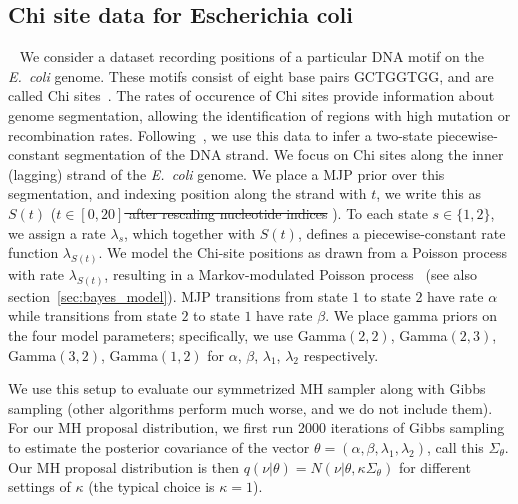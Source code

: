   \subsection{Chi site data for Escherichia coli}~
  We consider a dataset recording positions of a particular DNA motif 
  on the {\em E.\ coli} genome. 
  These motifs consist of eight base pairs GCTGGTGG, and are called Chi sites~\citep{FearnSher2006}.
  The rates of occurence of Chi sites provide information about genome 
  segmentation, allowing the identification of regions with high 
  mutation or recombination rates.
  Following~\cite{FearnSher2006}, we use this data to infer a two-state piecewise-constant segmentation of the DNA strand. 
  We focus on Chi sites along the inner (lagging) strand of the {\em E.\ coli} genome.  
  We place a MJP prior over this segmentation, and indexing position along the 
  strand with $t$, we write this as $S(t)$ (\sout{$t \in [0,20]$ after rescaling nucleotide indices}  ). 
  To each state $s \in \{1,2\}$, we assign a rate $\lambda_s$, which together with $S(t)$, defines a piecewise-constant rate function $\lambda_{S(t)}$. 
  We model the Chi-site positions as drawn from a Poisson process with rate 
  $\lambda_{S(t)}$, resulting in a {Markov-modulated Poisson process}~\citep{scottmmpp03} (see also section~\ref{sec:bayes_model}). 
  MJP transitions from state $1$ to state $2$ have rate $\alpha$ while transitions from state $2$ to state $1$ have rate $\beta$. 
  We place gamma priors on the four model parameters; specifically, we use Gamma$(2,2)$, Gamma$(2,3)$, Gamma$(3,2)$, Gamma$(1,2)$ for $\alpha$, $\beta$, $\lambda_1$, $\lambda_2$ respectively.


  We use this setup to evaluate our symmetrized MH sampler along with Gibbs sampling (other algorithms perform much worse, and we do not include them). 
  For our MH proposal distribution, we first run {2000} iterations of Gibbs sampling to estimate the posterior covariance of the vector $\theta = (\alpha,\beta,\lambda_1,\lambda_2)$, call this $\Sigma_\theta$. 
  Our MH proposal distribution is then $q(\nu|\theta) = N(\nu|\theta, \kappa\Sigma_\theta)$ for different settings of $\kappa$ (the typical choice is $\kappa = 1$). 

